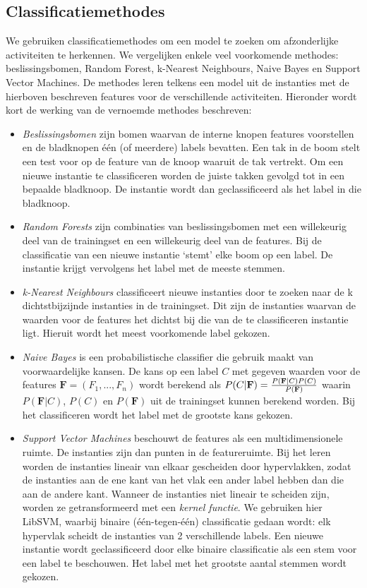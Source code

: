 \documentclass{article}
\begin{document}
\subsection{Classificatiemethodes}

We gebruiken classificatiemethodes om een model te zoeken om afzonderlijke activiteiten te herkennen. We vergelijken enkele veel voorkomende methodes: beslissingsbomen, Random Forest, k-Nearest Neighbours, Naive Bayes en Support Vector Machines. De methodes leren telkens een model uit de instanties met de hierboven beschreven features voor de verschillende activiteiten. Hieronder wordt kort de werking van de vernoemde methodes beschreven:

\begin{itemize}
\item \textit{Beslissingsbomen} zijn bomen waarvan de interne knopen features voorstellen en de bladknopen \'e\'en (of meerdere) labels bevatten. Een tak in de boom stelt een test voor op de feature van de knoop waaruit de tak vertrekt. Om een nieuwe instantie te classificeren worden de juiste takken gevolgd tot in een bepaalde bladknoop. De instantie wordt dan geclassificeerd als het label in die bladknoop.
\item \textit{Random Forests} zijn combinaties van beslissingsbomen met een willekeurig deel van de trainingset en een willekeurig deel van de features. Bij de classificatie van een nieuwe instantie `stemt' elke boom op een label. De instantie krijgt vervolgens het label met de meeste stemmen.
\item \textit{k-Nearest Neighbours} classificeert nieuwe instanties door te zoeken naar de k dichtstbijzijnde instanties in de trainingset. Dit zijn de instanties waarvan de waarden voor de features het dichtst bij die van de te classificeren instantie ligt. Hieruit wordt het meest voorkomende label gekozen.
\item \textit{Naive Bayes} is een probabilistische classifier die gebruik maakt van voorwaardelijke kansen. De kans op een label $C$ met gegeven waarden voor de features $\mathbf{F}=(F_1, ..., F_n)$ wordt berekend als $P(C|\mathbf{F}) = { P(\mathbf{F}|C) P(C) \over P(\mathbf{F}) }$ waarin $P(\mathbf{F}|C)$, $P(C)$ en $P(\mathbf{F})$ uit de trainingset kunnen berekend worden. Bij het classificeren wordt het label met de grootste kans gekozen.
\item \textit{Support Vector Machines} beschouwt de features als een multidimensionele ruimte. De instanties zijn dan punten in de featureruimte. Bij het leren worden de instanties lineair van elkaar gescheiden door hypervlakken, zodat de instanties aan de ene kant van het vlak een ander label hebben dan die aan de andere kant. Wanneer de instanties niet lineair te scheiden zijn, worden ze getransformeerd met een \textit{kernel functie}. We gebruiken hier LibSVM, %
waarbij binaire (\'e\'en-tegen-\'e\'en) classificatie gedaan wordt: elk hypervlak scheidt de instanties van 2 verschillende labels. Een nieuwe instantie wordt geclassificeerd door elke binaire classificatie als een stem voor een label te beschouwen. Het label met het grootste aantal stemmen wordt gekozen.
\end{itemize}
\end{document}
